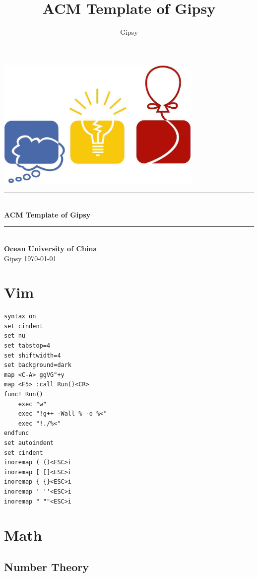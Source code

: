 \documentclass[twoside]{article}
\title{ACM Template of Gipsy}
\author{Gipsy}
\newcommand{\HRule}{\rule{\linewidth}{0.5mm}}
\begin{document}
\small
\begin{titlepage}
\begin{center}
\vspace*{0.5cm}\includegraphics[width=0.75\textwidth]{logo.jpg} \\ [2cm]
\HRule \\ [1cm]
\textbf{\Huge{ACM Template of Gipsy}} \\ [0.5cm]
\HRule \\ [4cm]
\textbf{\Huge{Ocean University of China}} \\ [1cm]
\LARGE{Gipsy}
\vfill
\Large{\today}
\end{center}
\clearpage
\end{titlepage}
\tableofcontents\clearpage
\pagestyle{fancy}
\lfoot{}
\cfoot{\thepage}\rfoot{}
\setcounter{section}{-1}
\setcounter{page}{1}
\clearpage\section{Vim}
\begin{lstlisting}
syntax on 
set cindent
set nu
set tabstop=4
set shiftwidth=4
set background=dark
map <C-A> ggVG"+y
map <F5> :call Run()<CR>
func! Run()
    exec "w"
    exec "!g++ -Wall % -o %<"
    exec "!./%<"
endfunc
set autoindent
set cindent
inoremap ( ()<ESC>i
inoremap [ []<ESC>i
inoremap { {}<ESC>i
inoremap ' ''<ESC>i
inoremap " ""<ESC>i\end{lstlisting}
\clearpage\section{Math}
\subsection{Number Theory}
\end{document}
